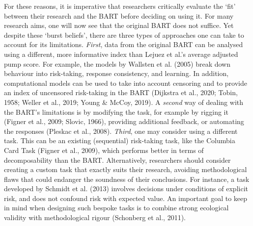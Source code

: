 \documentclass[serif, twocolumn, review]{jote-article}
\begin{document}
For these reasons, it is imperative that researchers critically evaluate the `fit' between their research and the BART before deciding on using it. For many research aims, one will now see that the original BART does not suffice. Yet despite these `burst beliefs', there are three types of approaches one can take to account for its limitations. \textit{First}, data from the original BART can be analysed using a different, more informative index than Lejuez et al.'s average adjusted pump score. For example, the models by Wallsten et al. (2005) break down behaviour into risk-taking, response consistency, and learning. In addition, computational models can be used to take into account censoring and to provide an index of uncensored risk-taking in the BART (Dijkstra et al., 2020; Tobin, 1958; Weller et al., 2019; Young \& McCoy, 2019). A \textit{second} way of dealing with the BART's limitations is by modifying the task, for example by rigging it (Figner et al., 2009; Slovic, 1966), providing additional feedback, or automating the responses (Pleskac et al., 2008). \textit{Third}, one may consider using a different task. This can be an existing (sequential) risk-taking task, like the Columbia Card Task (Figner et al., 2009), which performs better in terms of decomposability than the BART. Alternatively, researchers should consider creating a custom task that exactly suits their research, avoiding methodological flaws that could endanger the soundness of their conclusions. For instance, a task developed by Schmidt et al. (2013) involves decisions under conditions of explicit risk, and does not confound risk with expected value. An important goal to keep in mind when designing such bespoke tasks is to combine strong ecological validity with methodological rigour (Schonberg et al., 2011).
\end{document}
